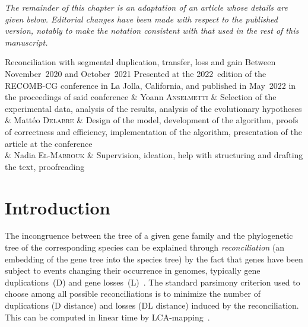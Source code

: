 \emph{The remainder of this chapter is an adaptation of an article whose details are given below. Editorial changes have been made with respect to the published version, notably to make the notation consistent with that used in the rest of this manuscript.}

\articlemeta%
    {Reconciliation with segmental duplication, transfer, loss and gain}%
    {Between November~2020 and October~2021}%
    {Presented at the 2022~edition of the RECOMB-CG conference in La Jolla, California, and published in May~2022 in the proceedings of said conference}%
    {& Yoann \textsc{Anselmetti} & Selection of the experimental data, analysis of the results, analysis of the evolutionary hypotheses \\
    \cmidrule(l){2-3}
    & Mattéo \textsc{Delabre} & Design of the model, development of the algorithm, proofs of correctness and efficiency, implementation of the algorithm, presentation of the article at the conference \\
    \cmidrule(l){2-3}
    & Nadia \textsc{El-Mabrouk} & Supervision, ideation, help with structuring and drafting the text, proofreading}

\newcommand{\superdtl}{SuperDTL}
\newcommand{\subseqDist}{\mathrm{D}^\mathrm{sub}}
\newcommand{\treeH}{H^\mathrm{tree}}
\newcommand{\speciesSet}{\Sigma}
\newcommand{\specdisp}[1]{\mathbf{#1}}
\newcommand{\syntdisp}[1]{\mathrm{#1}}
\newcommand{\syntenyLCAOf}{\syntenyOf^{\mathrm{lca}}}
\newcommand{\syntenyGAINOf}{\syntenyOf^{\mathrm{gain}}}
\newcommand{\eventLCA}{e^{\mathrm{min}}}
\newcommand{\supRec}{\mathcal{R}}
\newcommand{\supRecLCA}{\mathcal{R}^{\mathrm{min}}}
\newcommand{\eventE}{\mathcal{E}}
\newcommand{\eventDL}{\mathrm{DL}}
\newcommand{\eventDTL}{\mathrm{DTL}}
\newcommand{\eventDTLG}{\mathrm{DTLG}}
\newcommand{\costOf}[1]{C_{#1}}
\newcommand{\dt}[2]{\mathrm{#1}(#2)}


\section{Introduction}

The incongruence between the tree of a given gene family and the phylogenetic tree of the corresponding species can be explained through \emph{reconciliation} (an embedding of the gene tree into the species tree) by the fact that genes have been subject to events changing their occurrence in genomes, typically gene duplications~(D) and gene losses~(L)~\parencite{Goodman1979FittingGeneLineage}.
The standard parsimony criterion used to choose among all possible reconciliations
is to minimize the number of duplications (D distance) and losses (DL distance) induced by the reconciliation.
This can be computed in linear time by LCA-mapping~\parencite{Goodman1979FittingGeneLineage,Zhang1997MirkinMuchnikSmith,Zmasek2001SimpleAlgorithmInfer}.

